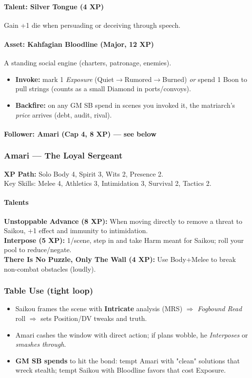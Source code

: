 \paragraph{Talent: Silver Tongue (4 XP)}
Gain +1 die when persuading or deceiving through speech.

\paragraph{Asset: Kahfagian Bloodline (Major, 12 XP)}
A standing social engine (charters, patronage, enemies).
\begin{itemize}
  \item \textbf{Invoke:} mark 1 \emph{Exposure} (Quiet$\to$Rumored$\to$Burned) \emph{or} spend 1 Boon to pull strings (counts as a small Diamond in ports/convoys).
  \item \textbf{Backfire:} on any GM SB spend in scenes you invoked it, the matriarch's \emph{price} arrives (debt, audit, rival).
\end{itemize}

\paragraph{Follower: Amari (Cap 4, 8 XP) — see below}

\subsubsection{Amari — The Loyal Sergeant}
\textbf{XP Path:} Solo \quad
Body 4, Spirit 3, Wits 2, Presence 2.\\
Key Skills: Melee 4, Athletics 3, Intimidation 3, Survival 2, Tactics 2.

\paragraph{Talents}
\textbf{Unstoppable Advance (8 XP):} When moving directly to remove a threat to Saikou, +1 effect and immunity to intimidation.\\
\textbf{Interpose (5 XP):} 1/scene, step in and take Harm meant for Saikou; roll your pool to reduce/negate.\\
\textbf{There Is No Puzzle, Only The Wall (4 XP):} Use Body+Melee to break non-combat obstacles (loudly).

\subsubsection{Table Use (tight loop)}
\begin{itemize}
  \item Saikou frames the scene with \textbf{Intricate} analysis (MRS) $\Rightarrow$ \emph{Fogbound Read} roll $\Rightarrow$ sets Position/DV tweaks and truth.
  \item Amari cashes the window with direct action; if plans wobble, he \emph{Interposes} or \emph{smashes through}.
  \item \textbf{GM SB spends} to hit the bond: tempt Amari with "clean" solutions that wreck stealth; tempt Saikou with Bloodline favors that cost Exposure.
\end{itemize}


